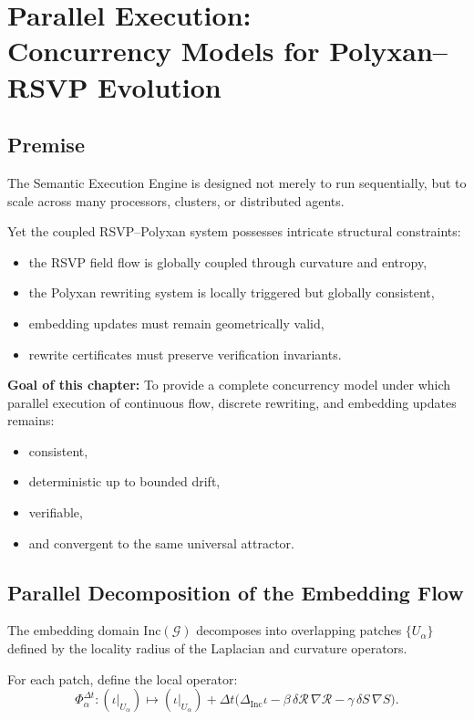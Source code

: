 \chapter{Parallel Execution:\\
Concurrency Models for Polyxan--RSVP Evolution}
\label{ch:76}

\section{Premise}

The Semantic Execution Engine is designed not merely to run sequentially,  
but to scale across many processors, clusters, or distributed agents.

Yet the coupled RSVP--Polyxan system possesses intricate structural constraints:

\begin{itemize}
\item the RSVP field flow is globally coupled through curvature and entropy,
\item the Polyxan rewriting system is locally triggered but globally consistent,
\item embedding updates must remain geometrically valid,
\item rewrite certificates must preserve verification invariants.
\end{itemize}

\noindent
\textbf{Goal of this chapter:}  
To provide a complete concurrency model under which parallel execution of
continuous flow, discrete rewriting, and embedding updates remains:

\begin{itemize}
\item consistent,
\item deterministic up to bounded drift,
\item verifiable,
\item and convergent to the same universal attractor.
\end{itemize}

\section{Parallel Decomposition of the Embedding Flow}

The embedding domain $\mathrm{Inc}(\mathcal{G})$ decomposes into overlapping
patches $\{U_\alpha\}$ defined by the locality radius of the Laplacian and
curvature operators.

For each patch, define the local operator:
\[
  \Phi_\alpha^{\Delta t} : (\iota|_{U_\alpha}) \mapsto
  (\iota|_{U_\alpha}) + \Delta t\bigl(
     \Delta_{\mathrm{Inc}} \iota
     - \beta\,\delta\mathcal{R}\,\nabla\mathcal{R}
     - \gamma\,\delta S\,\nabla S
  \bigr).
\]

